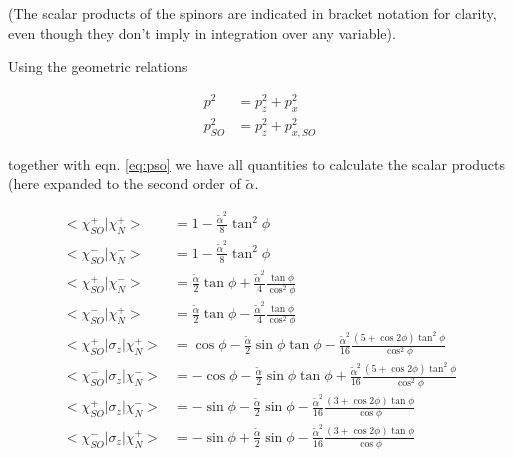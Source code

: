 \documentclass[11pt]{article}
\newcommand{\ta}{\tilde \alpha}
\begin{document}
(The scalar products of the spinors are indicated in bracket notation
for clarity, even though they don't imply in integration over any
variable).

Using the geometric relations

\begin{align}
    p^2         &= p_z^2 + p_x^2\\
    p_{SO}^2    &= p_z^2 + p_{x,SO}^2
\end{align}

together with eqn. \ref{eq:pso} we have all quantities to calculate
the scalar products (here expanded to the second order of $\ta$. 

\begin{align}
    <\chi_{SO}^+|\chi_N^+> &= 1 - \frac{\ta^2}{8} \tan^2 \phi \\
    <\chi_{SO}^-|\chi_N^-> &= 1 - \frac{\ta^2}{8} \tan^2 \phi\\
    <\chi_{SO}^+|\chi_N^-> &= \frac{\ta}{2} \tan \phi 
            + \frac{\ta^2}{4} \frac{\tan \phi}{\cos^2\phi}\\
    <\chi_{SO}^-|\chi_N^+> &= \frac{\ta}{2} \tan \phi 
            - \frac{\ta^2}{4} \frac{\tan \phi}{\cos^2\phi}\\
    <\chi_{SO}^+|\sigma_z|\chi_N^+> &= \cos \phi 
            - \frac{\ta}{2} \sin \phi \tan \phi
            - \frac{\ta^2}{16}\frac{(5 + \cos 2\phi)\tan^2 \phi}{\cos^2 \phi}\\
    <\chi_{SO}^-|\sigma_z|\chi_N^-> &= -\cos \phi 
            - \frac{\ta}{2} \sin \phi \tan \phi
            + \frac{\ta^2}{16}\frac{(5 + \cos 2\phi)\tan^2 \phi}{\cos^2 \phi}\\
    <\chi_{SO}^+|\sigma_z|\chi_N^-> &= - \sin \phi 
            - \frac{\ta}{2} \sin \phi 
            - \frac{\ta^2}{16} \frac{(3 + \cos 2\phi)\tan \phi}{\cos \phi}\\
    <\chi_{SO}^-|\sigma_z|\chi_N^+> &= - \sin \phi 
            + \frac{\ta}{2} \sin \phi 
            - \frac{\ta^2}{16} \frac{(3 + \cos 2\phi)\tan \phi}{\cos \phi}
\end{align}
\end{document}

